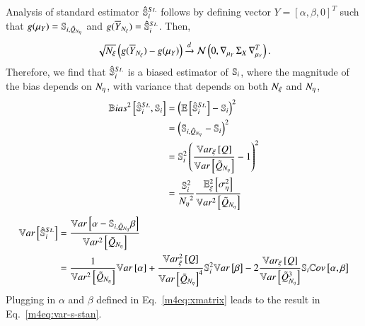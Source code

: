 Analysis of standard estimator $\pollSsalt{i}$ follows by defining vector $Y = \left[ \alpha, \beta, 0 \right]^T$ such that $g(\mu_Y) = \Spoll{i}$ and $g(\yavg) = \pollSsalt{i}$. 
Then,
\begin{equation*}
    \sqrt{\Nxi} \left( g(\yavg) - g(\mu_Y) \right) \cond \mathcal{N} \left( 0, \nabla_{\mu_Y} \, \Sigma_X \, \nabla_{\mu_Y}^T \right) .
\end{equation*}
%
Therefore, we find that $\pollSsalt{i}$ is a biased estimator of $\S{i}$, where the magnitude of the bias depends on $\Neta$, with variance that depends on both $\Nxi$ and $\Neta$,
\begin{align}
    \bias{\pollSsalt{i}, \S{i}} &= \left( \EE{\pollSsalt{i}} - \S{i} \right)^2 \\
    &= \left( \Spoll{i} - \S{i} \right)^2 \\
    &= \S{i}^2 \left( \frac{\Vxi{Q}}{\Var{\Qpoll}} - 1 \right)^2 \\
    &= \frac{\S{i}^2}{\Neta^2} \frac{\EExisq{\Sigsqeta}}{\Vsq{\Qpoll}}
\end{align}
\begin{align}
        \Var{\pollSsalt{i}} &= \frac{\Var{\alpha - \Spoll{i}\beta}}{\Vsq{\Qpoll}} \\
        &= \frac{1}{\Vsq{\Qpoll}}\Var{\alpha} + \frac{\Vxisq{Q}}{\Var{\Qpoll}^4}\S{i}^2 \Var{\beta} - 2 \frac{\Vxi{Q}}{\Var{\Qpoll^3}} \S{i} \Cov{\alpha}{\beta}
\end{align}
Plugging in $\alpha$ and $\beta$ defined in Eq.~\eqref{m4eq:xmatrix} leads to the result in Eq.~\ref{m4eq:var-s-stan}.

%
%
%
%
